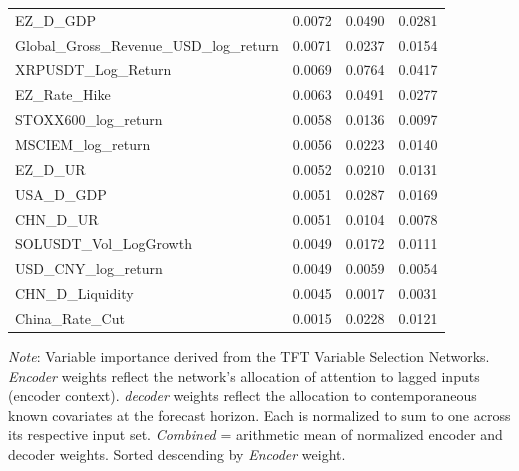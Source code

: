 \begin{tabular}{lccc}
  EZ\_D\_GDP & 0.0072 & 0.0490 & 0.0281 \\ 
  Global\_Gross\_Revenue\_USD\_log\_return & 0.0071 & 0.0237 & 0.0154 \\ 
  XRPUSDT\_Log\_Return & 0.0069 & 0.0764 & 0.0417 \\ 
  EZ\_Rate\_Hike & 0.0063 & 0.0491 & 0.0277 \\ 
  STOXX600\_log\_return & 0.0058 & 0.0136 & 0.0097 \\ 
  MSCIEM\_log\_return & 0.0056 & 0.0223 & 0.0140 \\ 
  EZ\_D\_UR & 0.0052 & 0.0210 & 0.0131 \\ 
  USA\_D\_GDP & 0.0051 & 0.0287 & 0.0169 \\ 
  CHN\_D\_UR & 0.0051 & 0.0104 & 0.0078 \\ 
  SOLUSDT\_Vol\_LogGrowth & 0.0049 & 0.0172 & 0.0111 \\ 
  USD\_CNY\_log\_return & 0.0049 & 0.0059 & 0.0054 \\ 
  CHN\_D\_Liquidity & 0.0045 & 0.0017 & 0.0031 \\ 
  China\_Rate\_Cut & 0.0015 & 0.0228 & 0.0121 \\ 
  \bottomrule
\end{tabular}
\par\vspace{4pt}
\begin{minipage}{\linewidth}
  \footnotesize \textit{Note}: Variable importance derived from the TFT Variable Selection Networks. \textit{Encoder} weights reflect the network's allocation of attention to lagged inputs (encoder context). \textit{decoder} weights reflect the allocation to contemporaneous known covariates at the forecast horizon. Each is normalized to sum to one across its respective input set. \textit{Combined} = arithmetic mean of normalized encoder and decoder weights. Sorted descending by \textit{Encoder} weight.
\end{minipage}